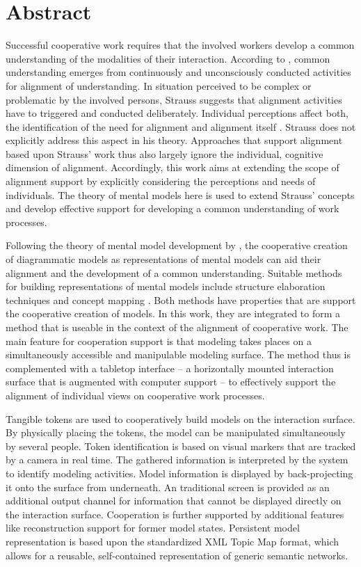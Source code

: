 \section*{Abstract}
Successful cooperative work requires that the involved workers develop a common understanding of the modalities of their interaction. According to \citet{Strauss85}, common understanding emerges from continuously and unconsciously conducted activities for alignment of understanding. In situation perceived to be complex or problematic by the involved persons, Strauss suggests that alignment activities have to triggered and conducted deliberately. Individual perceptions affect both, the identification of the need for alignment and alignment itself \citep{Grudin88}. Strauss does not explicitly address this aspect in his theory. Approaches that support alignment based upon Strauss' work thus also largely ignore the individual, cognitive dimension of alignment. Accordingly, this work aims at extending the scope of alignment support by explicitly considering the perceptions and needs of individuals. The theory of mental models \citep{Johnson-Laird81} here is used to extend Strauss' concepts and develop effective support for developing a common understanding of work processes.

Following the theory of mental model development by \citep{Seel91}, the cooperative creation of diagrammatic models as representations of mental models can aid their alignment and the development of a common understanding. Suitable methods for building representations of mental models include structure elaboration techniques and concept mapping \citep{Ifenthaler06}. Both methods have properties that are support the cooperative creation of models. In this work, they are integrated to form a method that is useable in the context of the alignment of cooperative work. The main feature for cooperation support is that modeling takes places on a simultaneously accessible and manipulable modeling surface. The method thus is complemented with a tabletop interface -- a horizontally mounted interaction surface that is augmented with computer support -- to effectively support the alignment of individual views on cooperative work processes.

Tangible tokens are used to cooperatively build models on the interaction surface. By physically placing the tokens, the model can be manipulated simultaneously by several people. Token identification is based on visual markers that are tracked by a camera in real time. The gathered information is interpreted by the system to identify modeling activities. Model information is displayed by back-projecting it onto the surface from underneath. An traditional screen is provided as an additional output channel for information  that cannot be displayed directly on the interaction surface. Cooperation is further supported by additional features like reconstruction support for former model states. Persistent model representation is based upon the standardized XML Topic Map format, which allows for a reusable, self-contained representation of generic semantic networks.

